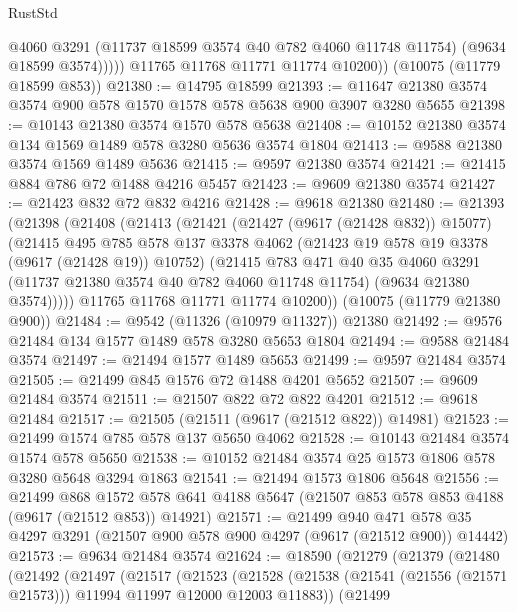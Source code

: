 \begin{lexlean}{RustStd}
\begin{coremodule}
{\begin{coremodule}
{{{{{{{{{{{{{{{{{{{{{{{{{{{{{{{{{                @4060
                @3291
                (@11737 @18599 @3574 @40 @782 @4060 @11748 @11754)
                (@9634 @18599 @3574)))))
        @11765
        @11768
        @11771
        @11774
        @10200))
    (@10075 (@11779 @18599 @853))
@21380 := @14795 @18599
@21393 := @11647 @21380 @3574 @3574 @900 @578 @1570 @1578 @578 @5638 @900 @3907 @3280 @5655
@21398 := @10143 @21380 @3574 @1570 @578 @5638
@21408 := @10152 @21380 @3574 @134 @1569 @1489 @578 @3280 @5636 @3574 @1804
@21413 := @9588 @21380 @3574 @1569 @1489 @5636
@21415 := @9597 @21380 @3574
@21421 := @21415 @884 @786 @72 @1488 @4216 @5457
@21423 := @9609 @21380 @3574
@21427 := @21423 @832 @72 @832 @4216
@21428 := @9618 @21380
@21480 := @21393
    (@21398
      (@21408
        (@21413
          (@21421
            (@21427 (@9617 (@21428 @832)) @15077)
            (@21415
              @495
              @785
              @578
              @137
              @3378
              @4062
              (@21423 @19 @578 @19 @3378 (@9617 (@21428 @19)) @10752)
              (@21415
                @783
                @471
                @40
                @35
                @4060
                @3291
                (@11737 @21380 @3574 @40 @782 @4060 @11748 @11754)
                (@9634 @21380 @3574)))))
        @11765
        @11768
        @11771
        @11774
        @10200))
    (@10075 (@11779 @21380 @900))
@21484 := @9542 (@11326 (@10979 @11327)) @21380
@21492 := @9576 @21484 @134 @1577 @1489 @578 @3280 @5653 @1804
@21494 := @9588 @21484 @3574
@21497 := @21494 @1577 @1489 @5653
@21499 := @9597 @21484 @3574
@21505 := @21499 @845 @1576 @72 @1488 @4201 @5652
@21507 := @9609 @21484 @3574
@21511 := @21507 @822 @72 @822 @4201
@21512 := @9618 @21484
@21517 := @21505 (@21511 (@9617 (@21512 @822)) @14981)
@21523 := @21499 @1574 @785 @578 @137 @5650 @4062
@21528 := @10143 @21484 @3574 @1574 @578 @5650
@21538 := @10152 @21484 @3574 @25 @1573 @1806 @578 @3280 @5648 @3294 @1863
@21541 := @21494 @1573 @1806 @5648
@21556 := @21499
    @868
    @1572
    @578
    @641
    @4188
    @5647
    (@21507 @853 @578 @853 @4188 (@9617 (@21512 @853)) @14921)
@21571 := @21499
    @940
    @471
    @578
    @35
    @4297
    @3291
    (@21507 @900 @578 @900 @4297 (@9617 (@21512 @900)) @14442)
@21573 := @9634 @21484 @3574
@21624 := @18590
    (@21279
      (@21379
        (@21480
          (@21492
            (@21497
              (@21517
                (@21523
                  (@21528
                    (@21538 (@21541 (@21556 (@21571 @21573))) @11994 @11997 @12000 @12003 @11883))
                  (@21499
}}}}}}}}}}}}}}}}}}}}}}}}}}}}}}}}}
\end{coremodule}}
\end{coremodule}
\end{lexlean}
